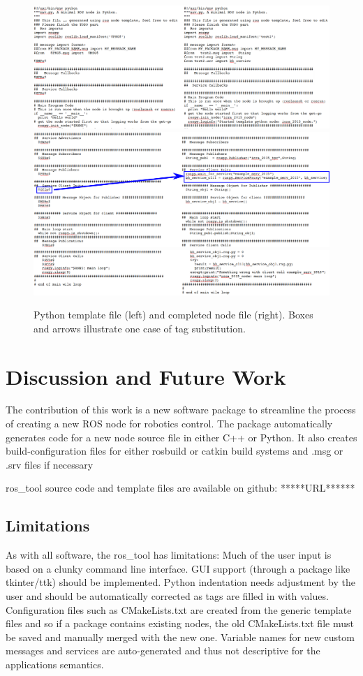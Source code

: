 \documentclass[letterpaper, 10 pt, conference]{ieeeconf}  %
\begin{document}
\begin{figure}
\includegraphics[width=6.25in]{sideBySide1.png}
\includegraphics[width=6.25in]{sideBySide2a.png}
\includegraphics[width=6.25in]{sideBySide3.png}
\caption{Python template file (left) and completed node file (right). Boxes and arrows illustrate one case of tag substitution.}
\label{sidebysidecode}
\end{figure}

\section{Discussion and Future Work}
The contribution of this work is a new software package to streamline the process of creating a new ROS node for robotics control. 
The package automatically generates 
code for a new node source file in either C++ or Python.  It also creates
build-configuration files for either rosbuild or catkin build systems and 
.msg or .srv files if necessary

ros\_tool source code and template files are available on github: *****URL******
\subsection{Limitations}
As with all software, the ros\_tool has limitations:
Much of the user input is based on a clunky command line interface.  GUI support (through a package like tkinter/ttk) should be implemented.
Python indentation needs adjustment by the user and should be automatically corrected as tags are filled in with values.
Configuration files such as CMakeLists.txt are created from the generic template files and so if a package contains existing nodes, the old CMakeLists.txt file must be saved and manually merged with the new one. 
Variable names for new custom messages and services are auto-generated and thus not descriptive for the applications semantics.  
\end{document}
